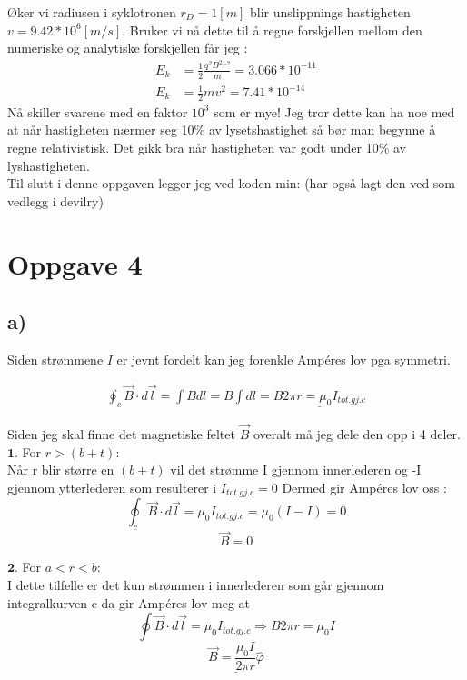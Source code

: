 \documentclass[a4paper,12pt,norsk]{article}
\begin{document}
Øker vi radiusen i syklotronen $r_D = 1 [m]$ blir unslippnings hastigheten $v = 9.42*10^6 [m/s]$. Bruker vi nå dette til å regne forskjellen mellom den numeriske og analytiske forskjellen får jeg :
\begin{align*}
E_k&=\frac{1}{2}\frac{q^2B^2r^2}{m} = 3.066*10^{-11}\\
E_k&=\frac{1}{2}mv^2 = 7.41*10^{-14}
\end{align*}
Nå skiller svarene med en faktor $10^3$ som er mye! Jeg tror dette kan ha noe med at når hastigheten nærmer seg 10\% av lysetshastighet så bør man begynne å regne relativistisk. Det gikk bra når hastigheten var godt under 10\% av lyshastigheten. \\

Til slutt i denne oppgaven legger jeg ved koden min: (har også lagt den ved som vedlegg i devilry)


\section{Oppgave 4}
\subsection{a)}
Siden strømmene $I$ er jevnt fordelt kan jeg forenkle Ampéres lov pga symmetri. 

\begin{align*}
\oint_c \vec{B} \cdot d\vec{l} = \int Bdl = B\int dl = \underline{B2\pi r = \mu_0 I_{tot.gj.c} }
\end{align*}

Siden jeg skal finne det magnetiske feltet $\vec{B}$ overalt må jeg dele den opp i 4 deler.\\


$\textbf{1.}$ For $r > (b+t)$:\\
Når r blir større en $(b+t)$ vil det strømme I gjennom innerlederen og -I gjennom ytterlederen som resulterer i $I_{tot.gj.c} = 0$ Dermed gir Ampéres lov oss :
$$\oint_c \vec{B} \cdot d\vec{l} = \mu_0 I_{tot.gj.c} = \mu_0(I-I) = 0$$ 
$$\vec{B} = 0$$

$\textbf{2.}$ For $a<r<b$:\\
I dette tilfelle er det kun strømmen i innerlederen som går gjennom integralkurven c da gir Ampéres lov meg at
$$\oint \vec{B} \cdot d\vec{l} = \mu_0 I_{tot.gj.c} \Rightarrow B2\pi r = \mu_0 I$$
$$\underline{\vec{B} = \frac{\mu_0 I}{2\pi r}\hat{\varphi}}$$
\end{document}
